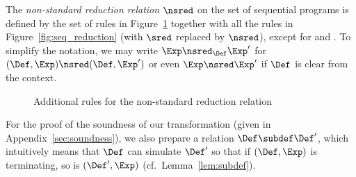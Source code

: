 \begin{definition}
    The \emph{non-standard reduction relation} $\nsred$ on the set of sequential programs is defined
    by the set of rules in Figure~\ref{fig:seq_reduction2} together with all the rules in
    Figure~\ref{fig:seq_reduction} (with $\sred$ replaced by $\nsred$), except for  and  .
    To simplify the notation, we may write \( \Exp \nsred_\Def \Exp' \) for \( (\Def, \Exp) \nsred (\Def, \Exp') \) or even \( \Exp \nsred \Exp' \) if \( \Def \) is clear from the context.
\end{definition}

\begin{figure}[tb]
    \centering
    \small
    \begin{minipage}{\linewidth}
        \centering
        \begin{prooftree}
        \end{prooftree}
    \end{minipage}
    \begin{minipage}{\linewidth}
        \centering
        \begin{prooftree}
        \end{prooftree}
    \end{minipage}
    \begin{minipage}{\linewidth}
        \centering
        \begin{prooftree}
        \end{prooftree}
    \end{minipage}

    \normalsize
    \caption{Additional rules for the  non-standard reduction relation}
    \label{fig:seq_reduction2}
\end{figure}

For the proof of the soundness of our transformation
(given in Appendix~\ref{sec:soundness}),
we also prepare a relation \( \Def \subdef \Def' \), which intuitively
means that \(\Def\) can simulate \(\Def'\) so that if \((\Def,\Exp)\) is terminating,
so is \((\Def',\Exp)\)
(cf.\ Lemma~\ref{lem:subdef}).

